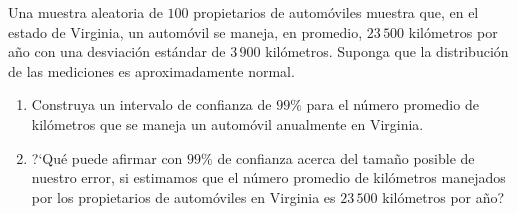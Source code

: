\begin{enunciado}
 Una muestra aleatoria de $100$ propietarios de autom\'oviles muestra que, en el estado de Virginia, un autom\'ovil se maneja, en promedio, $23\,500$ kil\'ometros por a\~no con una desviaci\'on est\'andar de $3\,900$ kil\'ometros.
 Suponga que la distribuci\'on de las mediciones es aproximadamente normal.
 \begin{enumerate}
  \item Construya un intervalo de confianza de $99\%$ para el n\'umero promedio de kil\'ometros que se maneja un autom\'ovil anualmente en Virginia.
  \item ?`Qu\'e puede afirmar con $99\%$ de confianza acerca del tama\~no posible de nuestro error, si estimamos que el n\'umero promedio de kil\'ometros manejados por los propietarios de autom\'oviles en Virginia es $23\,500$ kil\'ometros por a\~no?
 \end{enumerate}
\end{enunciado}

